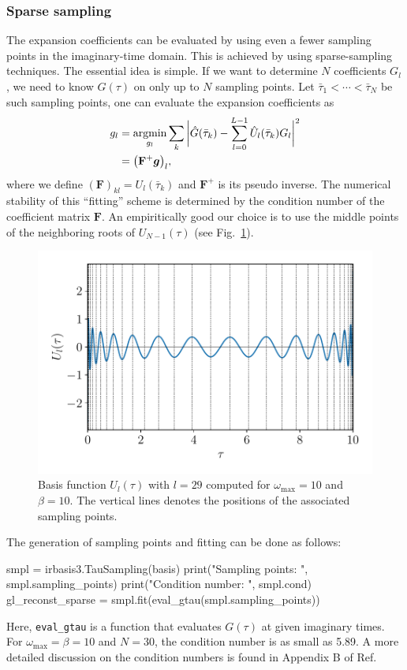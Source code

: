 \documentclass[submission, LectureNotes]{SciPost}
\newcommand{\wmax}{\ensuremath{{\omega_\mathrm{max}}}}
\newcommand{\tauk}{\ensuremath{\bar{\tau}_k}}
\newcommand{\Fmat}{{\mathbf{F}}}
\begin{document}
\subsubsection{Sparse sampling}
The expansion coefficients can be evaluated by using even a fewer sampling points in the imaginary-time domain.
This is achieved by using sparse-sampling techniques.
The essential idea is simple.
If we want to determine $N$ coefficients $G_l$,
we need to know $G(\tau)$ on only up to $N$ sampling points.
Let $\bar{\tau}_1 < \cdots < \bar{\tau}_N$ be such sampling points,
one can evaluate the expansion coefficients as
\begin{align}
    g_l &= \underset{g_l}{\mathrm{argmin}}
        \sum_k \bigg| \hat G(\tauk) - \sum_{l=0}^{L-1} \hat U_l(\tauk)G_l \bigg|^2\nonumber \\
    &= \pqty{\Fmat^+ \boldsymbol{g}}_l,\label{eq:fittau}
\end{align}
where we define $(\Fmat)_{kl} = U_l(\tauk)$ and $\Fmat^+$ is its pseudo inverse.
The numerical stability of this ``fitting'' scheme is determined
by the condition number of the coefficient matrix $\Fmat$.
An empiritically good our choice is to use the middle points of the neighboring roots of 
$U_{N-1}(\tau)$ (see Fig.~\ref{fig:sampling_points_tau}).
\begin{figure}
    \centering
    \includegraphics[width=0.6\columnwidth]{sampling_points_tau.pdf}
    \caption{
    Basis function $U_l(\tau)$ with $l=29$ computed for $\wmax=10$ and $\beta=10$.
    The vertical lines denotes the positions of the associated sampling points.
    }
    \label{fig:sampling_points_tau}
\end{figure}
The generation of sampling points and fitting can be done as follows:
\begin{python}
smpl = irbasis3.TauSampling(basis)
print("Sampling points: ", smpl.sampling_points)
print("Condition number: ", smpl.cond)
gl_reconst_sparse = smpl.fit(eval_gtau(smpl.sampling_points))
\end{python}
Here, \texttt{eval\_gtau} is a function that evaluates $G(\tau)$ at given imaginary times.
For $\wmax=\beta=10$ and $N=30$, the condition number is as small as 5.89.
A more detailed discussion on the condition numbers is found in Appendix B of Ref.~\cite{shinaoka2021efficient}
\end{document}
